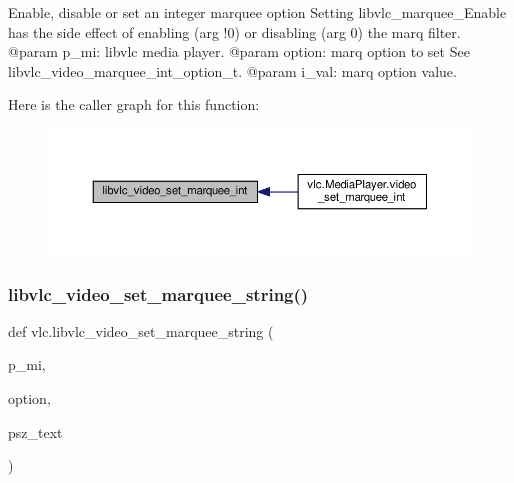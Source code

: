 \begin{DoxyVerb}Enable, disable or set an integer marquee option
Setting libvlc_marquee_Enable has the side effect of enabling (arg !0)
or disabling (arg 0) the marq filter.
@param p_mi: libvlc media player.
@param option: marq option to set See libvlc_video_marquee_int_option_t.
@param i_val: marq option value.
\end{DoxyVerb}
 Here is the caller graph for this function\+:
\nopagebreak
\begin{figure}[H]
\begin{center}
\leavevmode
\includegraphics[width=350pt]{namespacevlc_ae19a8b8caacacd5289023bee28ccff47_icgraph}
\end{center}
\end{figure}
\mbox{\label{namespacevlc_a820aaf1f58ece503b1e97ca798c8f117}} 
\subsubsection{\texorpdfstring{libvlc\+\_\+video\+\_\+set\+\_\+marquee\+\_\+string()}{libvlc\_video\_set\_marquee\_string()}}
{\footnotesize\ttfamily def vlc.\+libvlc\+\_\+video\+\_\+set\+\_\+marquee\+\_\+string (\begin{DoxyParamCaption}\item[{}]{p\+\_\+mi,  }\item[{}]{option,  }\item[{}]{psz\+\_\+text }\end{DoxyParamCaption})}

